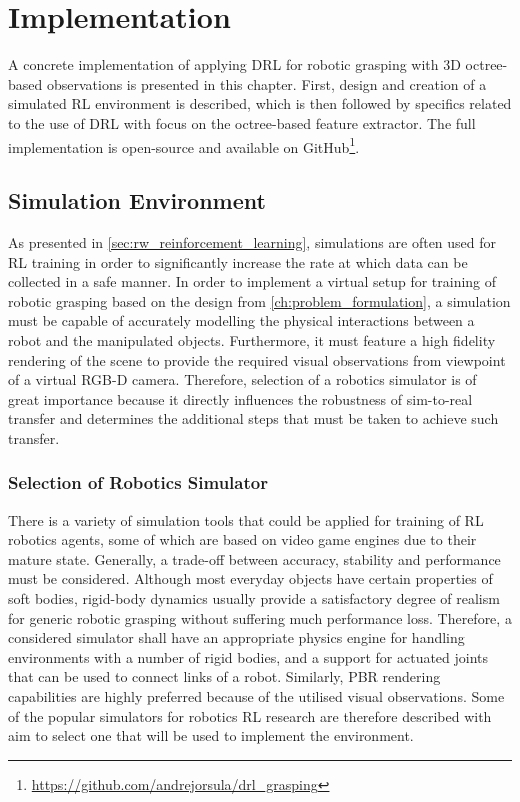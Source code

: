 \chapter{Implementation}\label{ch:implementation}

A concrete implementation of applying DRL for robotic grasping with 3D octree-based observations is presented in this chapter. First, design and creation of a simulated RL environment is described, which is then followed by specifics related to the use of DRL with focus on the octree-based feature extractor. The full implementation is open-source and available on GitHub\footnote{\href{https://github.com/andrejorsula/drl_grasping}{https://github.com/andrejorsula/drl\_grasping}}.


\section{Simulation Environment}\label{sec:impl_simulation_environment}

As presented in \autoref{sec:rw_reinforcement_learning}, simulations are often used for RL training in order to significantly increase the rate at which data can be collected in a safe manner. In order to implement a virtual setup for training of robotic grasping based on the design from \autoref{ch:problem_formulation}, a simulation must be capable of accurately modelling the physical interactions between a robot and the manipulated objects. Furthermore, it must feature a high fidelity rendering of the scene to provide the required visual observations from viewpoint of a virtual RGB-D camera. Therefore, selection of a robotics simulator is of great importance because it directly influences the robustness of sim-to-real transfer and determines the additional steps that must be taken to achieve such transfer.


\subsection{Selection of Robotics Simulator}

There is a variety of simulation tools that could be applied for training of RL robotics agents, some of which are based on video game engines due to their mature state. Generally, a trade-off between accuracy, stability and performance must be considered. Although most everyday objects have certain properties of soft bodies, rigid-body dynamics usually provide a satisfactory degree of realism for generic robotic grasping without suffering much performance loss. Therefore, a considered simulator shall have an appropriate physics engine for handling environments with a number of rigid bodies, and a support for actuated joints that can be used to connect links of a robot. Similarly, PBR rendering capabilities are highly preferred because of the utilised visual observations. Some of the popular simulators for robotics RL research are therefore described with aim to select one that will be used to implement the environment.

